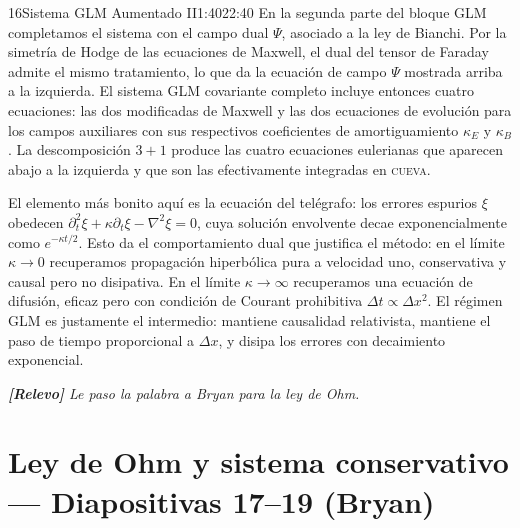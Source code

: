 \documentclass[11pt,a4paper]{article}
\newcommand{\relevo}[1]{%
  \par\medskip
  \noindent\colorbox{tagbg}{\parbox{\dimexpr\linewidth-2\fboxsep\relax}{%
    \small\itshape \textbf{[Relevo]} #1}}\par\medskip}
\begin{document}
\begin{seborador}{16}{Sistema GLM Aumentado II}{1:40}{22:40}
En la segunda parte del bloque GLM completamos el sistema con el campo dual
$\Psi$, asociado a la ley de Bianchi. Por la simetría de Hodge de las
ecuaciones de Maxwell, el dual del tensor de Faraday admite el mismo
tratamiento, lo que da la ecuación de campo $\Psi$ mostrada arriba a la
izquierda. El sistema GLM covariante completo incluye entonces cuatro
ecuaciones: las dos modificadas de Maxwell y las dos ecuaciones de evolución
para los campos auxiliares con sus respectivos coeficientes de
amortiguamiento $\kappa_E$ y $\kappa_B$. La descomposición $3+1$ produce las
cuatro ecuaciones eulerianas que aparecen abajo a la izquierda y que son las
efectivamente integradas en \textsc{cueva}.

El elemento más bonito aquí es la ecuación del telégrafo: los errores
espurios $\xi$ obedecen $\partial_t^2\xi+\kappa\partial_t\xi-\nabla^2\xi=0$,
cuya solución envolvente decae exponencialmente como $e^{-\kappa t/2}$. Esto
da el comportamiento dual que justifica el método: en el límite $\kappa\to 0$
recuperamos propagación hiperbólica pura a velocidad uno, conservativa y
causal pero no disipativa. En el límite $\kappa\to\infty$ recuperamos una
ecuación de difusión, eficaz pero con condición de Courant prohibitiva
$\Delta t\propto\Delta x^2$. El régimen GLM es justamente el intermedio:
mantiene causalidad relativista, mantiene el paso de tiempo proporcional a
$\Delta x$, y disipa los errores con decaimiento exponencial.
\relevo{Le paso la palabra a Bryan para la ley de Ohm.}
\end{seborador}

\section{Ley de Ohm y sistema conservativo --- Diapositivas 17--19 (Bryan)}
\end{document}
